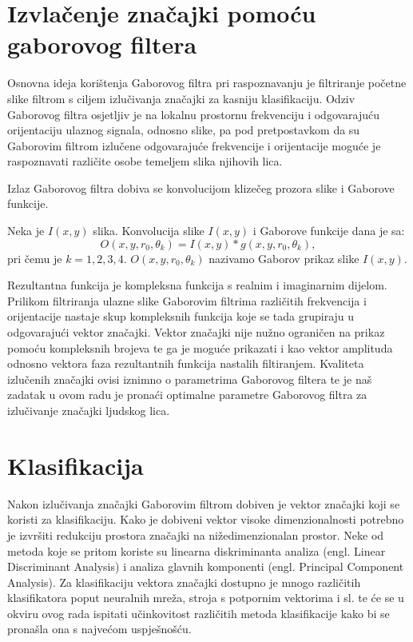 \documentclass{article}
\begin{document}
\section{Izvlačenje značajki pomoću gaborovog filtera}
Osnovna ideja korištenja Gaborovog filtra pri raspoznavanju je filtriranje početne 
slike filtrom s ciljem izlučivanja značajki za kasniju klasifikaciju.
Odziv Gaborovog filtra osjetljiv je na lokalnu prostornu frekvenciju i odgovarajuću orijentaciju
ulaznog signala, odnosno slike, pa pod pretpostavkom da su Gaborovim filtrom izlučene
odgovarajuće frekvencije i orijentacije moguće je raspoznavati različite osobe
temeljem slika njihovih lica.

Izlaz Gaborovog filtra dobiva se konvolucijom klizečeg prozora slike i Gaborove
funkcije.

Neka je $I(x,y)$ slika. Konvolucija slike $I(x,y)$ i Gaborove funkcije dana je
sa:
\begin{equation}
O(x,y,r_0, \theta_k) = I(x,y) * g(x,y,r_0, \theta_k),
\label{konvolucija-filter-slika}
\end{equation}
pri čemu je $k = 1, 2, 3, 4$. $O(x,y,r_0, \theta_k)$ nazivamo Gaborov prikaz
slike $I(x,y)$.

Rezultantna funkcija je kompleksna funkcija s realnim i imaginarnim dijelom. Prilikom 
filtriranja ulazne slike Gaborovim filtrima različitih frekvencija i orijentacije nastaje
skup kompleksnih funkcija koje se tada grupiraju u odgovarajući vektor značajki.
Vektor značajki nije nužno ograničen na prikaz pomoću kompleksnih brojeva te ga je moguće
prikazati i kao vektor amplituda odnosno vektora faza rezultantnih funkcija nastalih filtiranjem.
Kvaliteta izlučenih značajki ovisi iznimno o parametrima Gaborovog filtera te je 
naš zadatak u ovom radu je pronaći optimalne parametre Gaborovog filtra za izlučivanje
značajki ljudskog lica.


\section{Klasifikacija}

Nakon izlučivanja značajki Gaborovim filtrom dobiven je vektor značajki koji se koristi za klasifikaciju. 
Kako je dobiveni vektor visoke dimenzionalnosti potrebno je izvršiti redukciju prostora značajki na nižedimenzionalan prostor.
Neke od metoda koje se pritom koriste su linearna diskriminanta analiza (engl. Linear Discriminant Analysis) i analiza glavnih komponenti
(engl. Principal Component Analysis). 
Za klasifikaciju vektora značajki dostupno je mnogo različitih klasifikatora poput neuralnih mreža, stroja s potpornim vektorima i sl.
te će se u okviru ovog rada ispitati učinkovitost različitih metoda klasifikacije kako bi se pronašla ona s najvećom uspješnošću.
\end{document}
